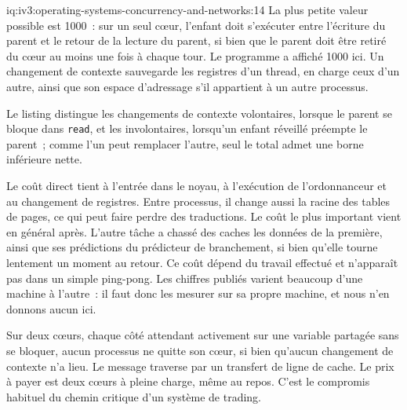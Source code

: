 \begin{solution}{iq:iv3:operating-systems-concurrency-and-networks:14}
La plus petite valeur possible est 1000~: sur un seul cœur, l'enfant doit s'exécuter entre l'écriture du parent et le retour de la lecture du parent, si bien que le parent doit être retiré du cœur au moins une fois à chaque tour. Le programme a affiché 1000 ici. Un changement de contexte sauvegarde les registres d'un thread, en charge ceux d'un autre, ainsi que son espace d'adressage s'il appartient à un autre processus.

Le listing distingue les changements de contexte volontaires, lorsque le parent se bloque dans \texttt{read}, et les involontaires, lorsqu'un enfant réveillé préempte le parent~; comme l'un peut remplacer l'autre, seul le total admet une borne inférieure nette.

Le coût direct tient à l'entrée dans le noyau, à l'exécution de l'ordonnanceur et au changement de registres. Entre processus, il change aussi la racine des tables de pages, ce qui peut faire perdre des traductions. Le coût le plus important vient en général après. L'autre tâche a chassé des caches les données de la première, ainsi que ses prédictions du prédicteur de branchement, si bien qu'elle tourne lentement un moment au retour. Ce coût dépend du travail effectué et n'apparaît pas dans un simple ping-pong. Les chiffres publiés varient beaucoup d'une machine à l'autre~: il faut donc les mesurer sur sa propre machine, et nous n'en donnons aucun ici.

Sur deux cœurs, chaque côté attendant activement sur une variable partagée sans se bloquer, aucun processus ne quitte son cœur, si bien qu'aucun changement de contexte n'a lieu. Le message traverse par un transfert de ligne de cache. Le prix à payer est deux cœurs à pleine charge, même au repos. C'est le compromis habituel du chemin critique d'un système de trading.

\end{solution}

